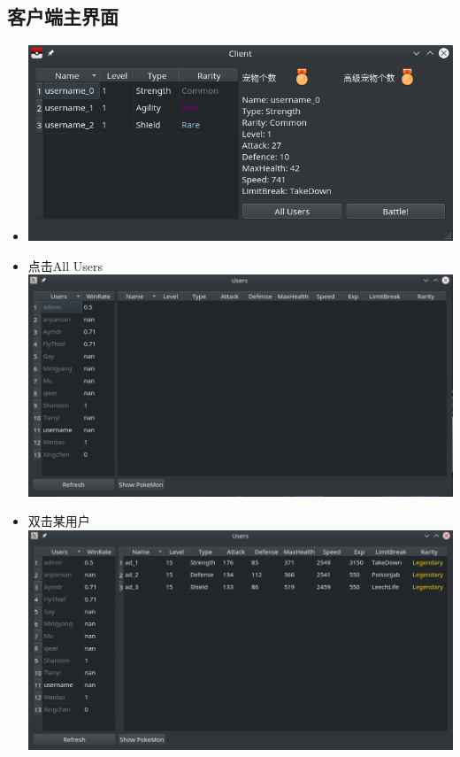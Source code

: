 \documentclass{article}
\begin{document}
\subsection{客户端主界面}
\begin{itemize}
\item \includegraphics[width=15cm]{./pokemon/客户端主界面.png}
\item 点击All Users\\
  \includegraphics[width=15cm]{./pokemon/查看所有用户.png}
\item 双击某用户\\
  \includegraphics[width=15cm]{./pokemon/查看某用户精灵.png}

\end{itemize}
\end{document}
